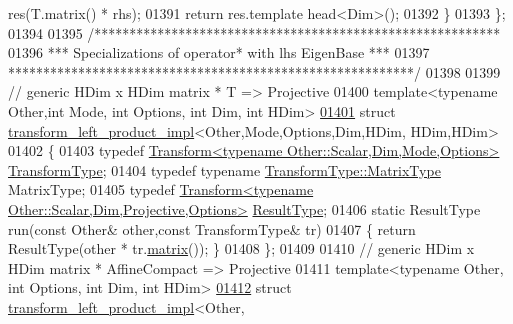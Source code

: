 \begin{DoxyCode}
      res(T.matrix() * rhs);
01391     \textcolor{keywordflow}{return} res.template head<Dim>();
01392   \}
01393 \};
01394 
01395 \textcolor{comment}{/**********************************************************}
01396 \textcolor{comment}{***   Specializations of operator* with lhs EigenBase   ***}
01397 \textcolor{comment}{**********************************************************/}
01398 
01399 \textcolor{comment}{// generic HDim x HDim matrix * T => Projective}
01400 \textcolor{keyword}{template}<\textcolor{keyword}{typename} Other,\textcolor{keywordtype}{int} Mode, \textcolor{keywordtype}{int} Options, \textcolor{keywordtype}{int} Dim, \textcolor{keywordtype}{int} HDim>
\hyperlink{struct_eigen_1_1internal_1_1transform__left__product__impl_3_01_other_00_01_mode_00_01_options_0d7a5c2fda4fe7320ea55777493bf1a2a}{01401} \textcolor{keyword}{struct }\hyperlink{struct_eigen_1_1internal_1_1transform__left__product__impl}{transform\_left\_product\_impl}<Other,Mode,Options,Dim,HDim, HDim,HDim>
01402 \{
01403   \textcolor{keyword}{typedef} \hyperlink{group___geometry___module_class_eigen_1_1_transform}{Transform<typename Other::Scalar,Dim,Mode,Options>}
       \hyperlink{group___geometry___module_class_eigen_1_1_transform}{TransformType};
01404   \textcolor{keyword}{typedef} \textcolor{keyword}{typename} \hyperlink{group___core___module_class_eigen_1_1_matrix}{TransformType::MatrixType} MatrixType;
01405   \textcolor{keyword}{typedef} \hyperlink{group___geometry___module_class_eigen_1_1_transform}{Transform<typename Other::Scalar,Dim,Projective,Options>}
       \hyperlink{group___geometry___module_class_eigen_1_1_transform}{ResultType};
01406   \textcolor{keyword}{static} ResultType run(\textcolor{keyword}{const} Other& other,\textcolor{keyword}{const} TransformType& tr)
01407   \{ \textcolor{keywordflow}{return} ResultType(other * tr.\hyperlink{group___geometry___module_aec8168000a88a807130d41020af98d47}{matrix}()); \}
01408 \};
01409 
01410 \textcolor{comment}{// generic HDim x HDim matrix * AffineCompact => Projective}
01411 \textcolor{keyword}{template}<\textcolor{keyword}{typename} Other, \textcolor{keywordtype}{int} Options, \textcolor{keywordtype}{int} Dim, \textcolor{keywordtype}{int} HDim>
\hyperlink{struct_eigen_1_1internal_1_1transform__left__product__impl_3_01_other_00_01_affine_compact_00_01ed09886be52acac174d30c2c7403587b}{01412} \textcolor{keyword}{struct }\hyperlink{struct_eigen_1_1internal_1_1transform__left__product__impl}{transform\_left\_product\_impl}<Other,

\end{DoxyCode}
